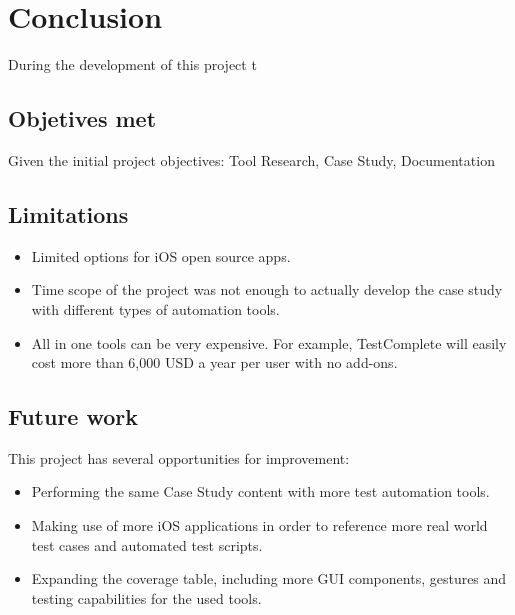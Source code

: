 %
\chapter{Conclusion}
\label{chapter5}

During the development of this project t

\section{Objetives met}
Given the initial project objectives: Tool Research, Case Study, Documentation

\section{Limitations}
	\begin{itemize}
		\item Limited options for iOS open source apps.
		\item Time scope of the project was not enough to actually develop the case study with different types of automation tools.
		\item All in one tools can be very expensive. For example, TestComplete will easily cost more than 6,000 USD a year per user with no add-ons.
	\end{itemize}


\section{Future work}

This project has several opportunities for improvement:

	\begin{itemize}
		\item Performing the same Case Study content with more test automation tools. 
		\item Making use of more iOS applications in order to reference more real world test cases and automated test scripts.
		\item Expanding the coverage table, including more GUI components, gestures and testing capabilities for the used tools.
	\end{itemize}

